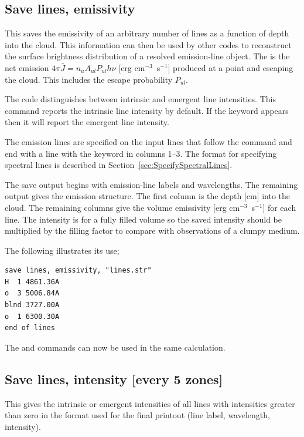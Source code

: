 \subsection{Save lines, emissivity}

This saves the emissivity of an arbitrary number of lines as a function
of depth into the cloud.  This information can then be used by other codes
to reconstruct the surface brightness distribution of a resolved
emission-line object.  The 
is the net emission
$4\pi \bar J = n_u A_{ul} P_{ul} h\nu $
[erg cm$^{-3}$~s$^{-1}$] produced at a point and escaping the cloud.
This includes the escape probability $P_{ul}$.

The code distinguishes between intrinsic and emergent
line intensities.
This command reports the intrinsic line intensity by default.
If the keyword  appears then it will
report the emergent line intensity.

The emission lines are specified on the input lines that follow the
command and end with a line with the keyword  in columns 1--3.
The format for specifying spectral lines is described in Section~\ref{sec:SpecifySpectralLines}.

The save output begins with emission-line labels and wavelengths.  The
remaining output gives the emission structure.  The first column is the
depth [cm] into the cloud.  The remaining columns give the volume emissivity
[erg cm$^{-3}$~s$^{-1}$] for each line.  The intensity is for a fully filled volume
so the saved intensity should be multiplied by the filling factor to
compare with observations of a clumpy medium.

The following illustrates its use;
\begin{verbatim}
save lines, emissivity, "lines.str"
H  1 4861.36A
o  3 5006.84A
blnd 3727.00A
o  1 6300.30A
end of lines
\end{verbatim}

The  and  commands can now be used in the same calculation.

\subsection{Save lines, intensity [every 5 zones]}

This gives the
intrinsic or emergent intensities of all lines with
intensities greater than zero in the format used for the final printout
(line label, wavelength, intensity).

